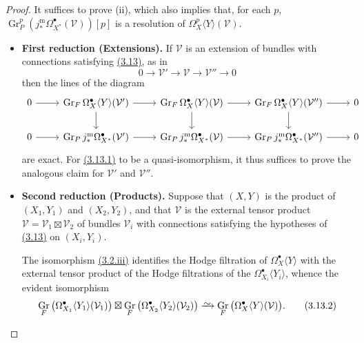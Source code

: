\documentclass{report}
\renewcommand{\cal}[1]{{\mathcal{#1}}}
\newcommand{\simto}{\xrightarrow{\raisebox{-0.7ex}[0ex][0ex]{$\sim$}}}
\DeclareMathOperator{\Gr}{Gr}
\begin{document}
\begin{proof}
  It suffices to prove (ii), which also implies that, for each $p$, $\Gr_P^p(j_*^\mathrm{m}\Omega_{X^*}^\bullet(\cal{V}))[p]$ is a resolution of $\Omega_X^p\langle Y\rangle(\cal{V})$.

  \begin{itemize}
    \item[] \textbf{First reduction (Extensions).}
      If $\cal{V}$ is an extension of bundles with connections satisfying \hyperref[II.3.13]{(3.13)}, as in
      \[
        0 \to \cal{V}' \to \cal{V} \to \cal{V}'' \to 0
      \]
      then the lines of the diagram
      \[
        \begin{tikzcd}
          0 \rar
          & \Gr_F\Omega_X^\bullet\langle Y\rangle(\cal{V}') \rar \dar
          & \Gr_F\Omega_X^\bullet\langle Y\rangle(\cal{V}) \rar \dar
          & \Gr_F\Omega_X^\bullet\langle Y\rangle(\cal{V}'') \rar \dar
          & 0
        \\0 \rar
          & \Gr_Pj_*^\mathrm{m}\Omega_{X^*}^\bullet(\cal{V}') \rar
          & \Gr_Pj_*^\mathrm{m}\Omega_{X^*}^\bullet(\cal{V}) \rar
          & \Gr_Pj_*^\mathrm{m}\Omega_{X^*}^\bullet(\cal{V}'') \rar
          & 0
        \end{tikzcd}
      \]
      are exact.
      For \hyperref[II.3.13.1]{(3.13.1)} to be a quasi-isomorphism, it thus suffices to prove the analogous claim for $\cal{V}'$ and $\cal{V}''$.
    \item[] \textbf{Second reduction (Products).}
      Suppose that $(X,Y)$ is the product of $(X_1,Y_1)$ and $(X_2,Y_2)$, and that $\cal{V}$ is the external tensor product $\cal{V}=\cal{V}_1\boxtimes\cal{V}_2$ of bundles $\cal{V}_i$ with connections satisfying the hypotheses of \hyperref[II.3.13]{(3.13)} on $(X_i,Y_i)$.

      The isomorphism \hyperref[II.3.2]{(3.2.iii)} identifies the Hodge filtration of $\Omega_X^\bullet\langle Y\rangle$ with the external tensor product of the Hodge filtrations of the $\Omega_{X_i}^\bullet\langle Y_i\rangle$, whence the evident isomorphism
      \[
      \label{II.3.13.2}
        \Gr_F\big(\Omega_{X_1}^\bullet\langle Y_1\rangle(\cal{V}_1)\big)
        \boxtimes \Gr_F\big(\Omega_{X_2}^\bullet\langle Y_2\rangle(\cal{V}_2)\big)
        \simto \Gr_F\big(\Omega_X^\bullet\langle Y\rangle(\cal{V})\big).
      \tag{3.13.2}
      \]


\end{itemize}
\end{proof}
\end{document}

